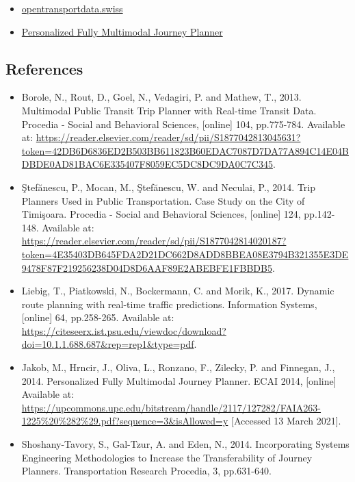 \documentclass[
]{book}
\providecommand{\tightlist}{%
  \setlength{\itemsep}{0pt}\setlength{\parskip}{0pt}}
\begin{document}
\begin{itemize}
\tightlist
\item
  \href{https://opentransportdata.swiss/en/cookbook/open-journey-planner-ojp/}{opentransportdata.swiss}
\item
  \href{https://upcommons.upc.edu/bitstream/handle/2117/127282/FAIA263-1225\%20\%282\%29.pdf?sequence=3\&isAllowed=y}{Personalized Fully Multimodal Journey Planner}
\end{itemize}

\hypertarget{references-10}{%
\subsection*{References}\label{references-10}}

\begin{itemize}
\tightlist
\item
  Borole, N., Rout, D., Goel, N., Vedagiri, P. and Mathew, T., 2013. Multimodal Public Transit Trip Planner with Real-time Transit Data. Procedia - Social and Behavioral Sciences, {[}online{]} 104, pp.775-784. Available at: \url{https://reader.elsevier.com/reader/sd/pii/S1877042813045631?token=42DB6D6836ED2B503BB611823B60EDAC7087D7DA77A894C14E04BDBDE0AD81BAC6E335407F8059EC5DC8DC9DA0C7C345}.
\item
  Ştefănescu, P., Mocan, M., Ştefănescu, W. and Neculai, P., 2014. Trip Planners Used in Public Transportation. Case Study on the City of Timişoara. Procedia - Social and Behavioral Sciences, {[}online{]} 124, pp.142-148. Available at: \url{https://reader.elsevier.com/reader/sd/pii/S1877042814020187?token=4E35403DB645FDA2D21DC662D8ADD8BBEA08E3794B321355E3DE9478F87F219256238D04D8D6AAF89E2ABEBFE1FBBDB5}.
\item
  Liebig, T., Piatkowski, N., Bockermann, C. and Morik, K., 2017. Dynamic route planning with real-time traffic predictions. Information Systems, {[}online{]} 64, pp.258-265. Available at: \url{https://citeseerx.ist.psu.edu/viewdoc/download?doi=10.1.1.688.687\&rep=rep1\&type=pdf}.
\item
  Jakob, M., Hrncir, J., Oliva, L., Ronzano, F., Zilecky, P. and Finnegan, J., 2014. Personalized Fully Multimodal Journey Planner. ECAI 2014, {[}online{]} Available at: \url{https://upcommons.upc.edu/bitstream/handle/2117/127282/FAIA263-1225\%20\%282\%29.pdf?sequence=3\&isAllowed=y} {[}Accessed 13 March 2021{]}.
\item
  Shoshany-Tavory, S., Gal-Tzur, A. and Eden, N., 2014. Incorporating Systems Engineering Methodologies to Increase the Transferability of Journey Planners. Transportation Research Procedia, 3, pp.631-640.

\end{itemize}
\end{document}
